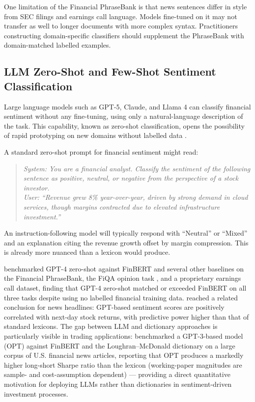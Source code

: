 One limitation of the Financial PhraseBank is that news sentences differ in style from SEC filings and earnings call language. Models fine-tuned on it may not transfer as well to longer documents with more complex syntax. Practitioners constructing domain-specific classifiers should supplement the PhraseBank with domain-matched labelled examples.

\subsection{LLM Zero-Shot and Few-Shot Sentiment Classification}
\label{sec:ch09-llm-zeroshot-fewshot}

Large language models such as GPT-5, Claude, and Llama 4 can classify financial sentiment without any fine-tuning, using only a natural-language description of the task. This capability, known as zero-shot classification, opens the possibility of rapid prototyping on new domains without labelled data \cite{brown2020language}.

A standard zero-shot prompt for financial sentiment might read:

\begin{quote}
\textit{System: You are a financial analyst. Classify the sentiment of the following sentence as positive, neutral, or negative from the perspective of a stock investor.\\
User: ``Revenue grew 8\% year-over-year, driven by strong demand in cloud services, though margins contracted due to elevated infrastructure investment.''}
\end{quote}

An instruction-following model will typically respond with ``Neutral'' or ``Mixed'' and an explanation citing the revenue growth offset by margin compression. This is already more nuanced than a lexicon would produce.

\citet{ko2024can} benchmarked GPT-4 zero-shot against FinBERT and several other baselines on the Financial PhraseBank, the FiQA opinion task \cite{maia2018fiqa}, and a proprietary earnings call dataset, finding that GPT-4 zero-shot matched or exceeded FinBERT on all three tasks despite using no labelled financial training data. \citet{LopezLiraTang2023} reached a related conclusion for news headlines: GPT-based sentiment scores are positively correlated with next-day stock returns, with predictive power higher than that of standard lexicons. The gap between LLM and dictionary approaches is particularly visible in trading applications: \citet{KirtacGermano2024} benchmarked a GPT-3-based model (OPT) against FinBERT and the Loughran--McDonald dictionary on a large corpus of U.S. financial news articles, reporting that OPT produces a markedly higher long-short Sharpe ratio than the lexicon (working-paper magnitudes are sample- and cost-assumption dependent) --- providing a direct quantitative motivation for deploying LLMs rather than dictionaries in sentiment-driven investment processes.


